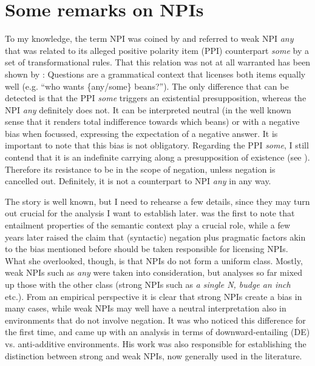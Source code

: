 \documentclass[output=paper,colorlinks,citecolor=brown,
]{langscibook}
\begin{document}
\section{Some remarks on NPIs}

To my knowledge, the term NPI was coined by \citet{klima1964} and referred to weak NPI \textit{any} that was related to
its alleged positive polarity item (PPI) counterpart \textit{some} by a set of transformational rules. That this
relation was not at all warranted has been shown by \citet{lakoffrob1969}: Questions are a grammatical context that
licenses both items equally well (e.g. ``who wants \{any/some\} beans?''). The only difference that can be detected is
that the PPI \textit{some} triggers an existential presupposition, whereas the NPI \textit{any} definitely does not. It
can be interpreted neutral (in the well known sense that it renders total indifference towards which beans) or with a
negative bias when focussed, expressing the expectation of a negative answer. It is important to note that this bias is not
obligatory. Regarding the PPI \textit{some}, I still contend that it is an indefinite carrying along a presupposition
of existence (see \citealt{neubarth2006}). Therefore its resistance to be in the scope of negation, unless negation
is cancelled out. Definitely, it is not a counterpart to NPI \textit{any} in any way.

The story is well known, but I need to rehearse a few details, since they may turn out crucial for the analysis I want
to establish later. \citet{ladusaw1979} was the first to note that entailment properties of the semantic context play a
crucial role, while a few years later \citet{linebarger1987} raised the claim that (syntactic) negation plus pragmatic
factors akin to the bias mentioned before should be taken responsible for licensing NPIs. What she overlooked, though,
is that NPIs do not form a uniform class. Mostly, weak NPIs such as \textit{any} were taken into consideration, but
analyses so far mixed up those with the other class (strong NPIs such as \textit{a single N, budge an inch} etc.). From
an empirical perspective it is clear that strong NPIs create a bias in many cases, while weak NPIs may well have a
neutral interpretation also in environments that do not involve negation. It was \citet{heim1984} who noticed this
difference for the first time, and \citet{zwarts1990, zwarts1998} came up with an analysis in terms of
downward-entailing (DE) vs. anti-additive environments. His work was also responsible for establishing the distinction
between strong and weak NPIs, now generally used in the literature.
\end{document}
